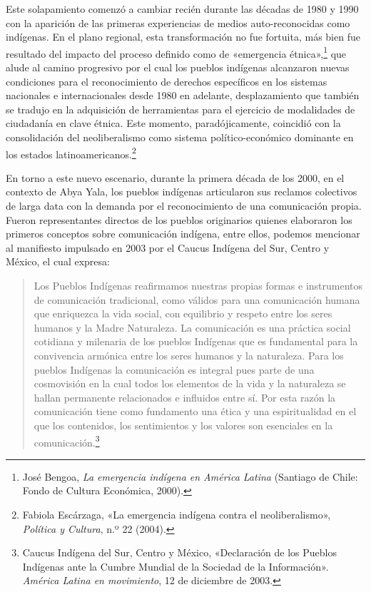 \documentclass{tufte-handout}
\begin{document}
Este solapamiento comenzó a cambiar recién durante las décadas de 1980 y
1990 con la aparición de las primeras experiencias de medios
auto-reconocidas como indígenas. En el plano regional, esta
transformación no fue fortuita, más bien fue resultado del impacto del
proceso definido como de «emergencia étnica»,\footnote{José Bengoa,
  \emph{La emergencia indígena en América Latina} (Santiago de Chile:
  Fondo de Cultura Económica, 2000).} que alude al camino progresivo por
el cual los pueblos indígenas alcanzaron nuevas condiciones para el
reconocimiento de derechos específicos en los sistemas nacionales e
internacionales desde 1980 en adelante, desplazamiento que también se
tradujo en la adquisición de herramientas para el ejercicio de
modalidades de ciudadanía en clave étnica. Este momento,
paradójicamente, coincidió con la consolidación del neoliberalismo como
sistema político-económico dominante en los estados
latinoamericanos.\footnote{Fabiola Escárzaga, «La emergencia indígena
  contra el neoliberalismo», \emph{Política y Cultura}, n.º 22 (2004).}

En torno a este nuevo escenario, durante la primera década de los 2000,
en el contexto de Abya Yala, los pueblos indígenas articularon sus
reclamos colectivos de larga data con la demanda por el reconocimiento
de una comunicación propia. Fueron representantes directos de los
pueblos originarios quienes elaboraron los primeros conceptos sobre
comunicación indígena, entre ellos, podemos mencionar al manifiesto
impulsado en 2003 por el Caucus Indígena del Sur, Centro y México, el
cual expresa:

\begin{quote}
Los Pueblos Indígenas reafirmamos nuestras propias formas e instrumentos
de comunicación tradicional, como válidos para una comunicación humana
que enriquezca la vida social, con equilibrio y respeto entre los seres
humanos y la Madre Naturaleza. La comunicación es una práctica social
cotidiana y milenaria de los pueblos Indígenas que es fundamental para
la convivencia armónica entre los seres humanos y la naturaleza. Para
los pueblos Indígenas la comunicación es integral pues parte de una
cosmovisión en la cual todos los elementos de la vida y la naturaleza se
hallan permanente relacionados e influidos entre sí. Por esta razón la
comunicación tiene como fundamento una ética y una espiritualidad en el
que los contenidos, los sentimientos y los valores son esenciales en la
comunicación.\footnote{Caucus Indígena del Sur, Centro y México,
  «Declaración de los Pueblos Indígenas ante la Cumbre Mundial de la
  Sociedad de la Información». \emph{América Latina en movimiento}, 12
  de diciembre de 2003.}
\end{quote}
\end{document}
